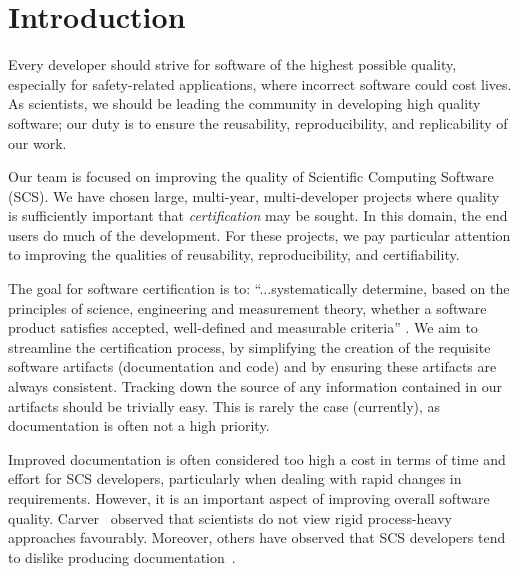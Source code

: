 \documentclass[sigconf]{acmart}
\begin{document}

\maketitle

\section{Introduction} \label{SecIntroduction}

Every developer should strive for software of the highest possible quality,
especially for safety-related applications, where incorrect software could
cost lives. As scientists, we should be leading the community in developing high
quality software; our duty is to ensure the reusability, reproducibility, and
replicability of our work.

Our team is focused on improving the quality of Scientific Computing Software (SCS).
We have chosen large, multi-year, multi-developer projects where quality is
sufficiently important that \emph{certification} may be sought.  In this 
domain, the end users do much of the development. For these projects, we pay
particular attention to improving the qualities of reusability, reproducibility,
and certifiability. 

The goal for software certification is to: ``...systematically determine, based
on the principles of science, engineering and measurement theory, whether a
software product satisfies accepted, well-defined and measurable criteria''
\cite[p.~12]{HatcliffEtAl2009}.  We aim to streamline the certification process,
by simplifying the creation of the requisite software artifacts (documentation
and code) and by ensuring these artifacts are always consistent. Tracking
down the source of any information contained in our artifacts should be
trivially easy.  This is rarely the case (currently), as documentation is often
not a high priority.

Improved documentation is often considered too high a cost in terms of time and 
effort for SCS developers, particularly when dealing with rapid changes in 
requirements. However, it is an important aspect of improving overall software 
quality. Carver~\cite{CarverEtAl2007} observed that scientists do not view 
rigid process-heavy approaches favourably. Moreover, others have observed that
SCS developers tend to dislike producing documentation~\cite[p.~373]{Roache1998}.
\end{document}
